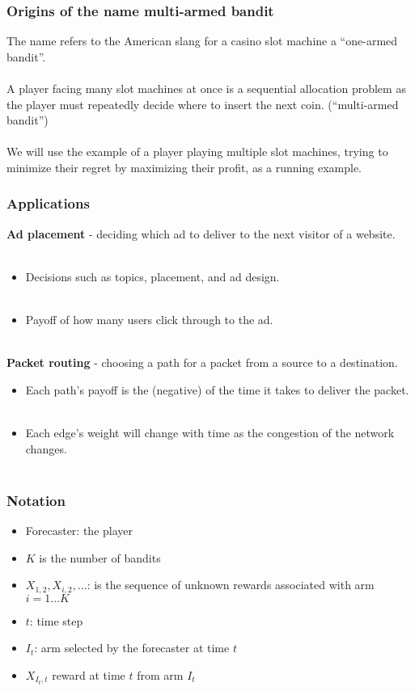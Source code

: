 \documentclass{beamer}
\begin{document}
\begin{frame}
\frametitle{Origins of the name multi-armed bandit}
The name refers to the American slang for a casino slot machine a “one-armed bandit”. \\~\\

A player facing many slot machines at once is a sequential allocation problem as the player must repeatedly decide where to insert the next coin. (“multi-armed bandit”) \\~\\

We will use the example of a player playing multiple slot machines, trying to minimize their regret by maximizing their profit, as a running example.

\end{frame}

\begin{frame}
\frametitle{Applications}
\textbf{Ad placement} - deciding which ad to deliver to the next visitor of a website.\\~\\
\begin{itemize}
\setlength\itemsep{-.5em}
\item  Decisions such as topics, placement, and ad design.\\~\\
\item  Payoff of how many users click through to the ad. \\~\\
\end{itemize}

\textbf{Packet routing} - choosing a path for a packet from a source to a destination.
\begin{itemize}
\setlength\itemsep{-.5em}
\item  Each path’s payoff is the (negative) of the time it takes to deliver the packet. \\~\\
\item Each edge’s weight will change with time as the congestion of the network changes. \\~\\
\end{itemize}
\end{frame}

\begin{frame}
\frametitle{Notation}

\begin{itemize}
\item Forecaster: the player
\item $K$ is the number of bandits
\item $X_{1,2}, X_{i,2}, \dots$: is the sequence of unknown rewards associated with arm $i=1\dots K$
\item $t$: time step
\item $I_t$: arm selected by the forecaster at time $t$
\item $X_{I_t, t}$ reward at time $t$ from arm $I_t$
\end{itemize}

\end{frame}
\end{document}
